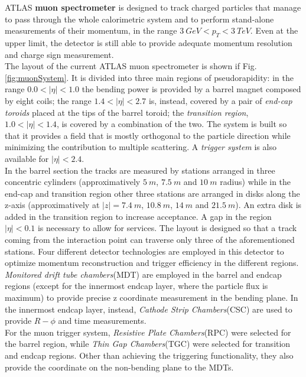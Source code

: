 \documentclass[a4paper,twoside,12pt]{article}
\begin{document}
ATLAS \textbf{muon spectrometer} is designed to track charged particles that manage to pass through the whole calorimetric system and to perform stand-alone measurements of their momentum, in the range 
$3\ GeV < p_{T} < 3\ TeV$. Even at the upper limit, the detector is still able to provide adequate momentum resolution and charge sign measurement.\\

The layout of the current  ATLAS muon spectrometer is shown if Fig. \ref{fig:muonSystem}. It is divided into three main regions of pseudorapidity: in the range $0.0 < |\eta| < 1.0$ the bending power
is provided by a barrel magnet composed by eight coils; the range $1.4 < |\eta| < 2.7$ is, instead, covered by a pair of \textit{end-cap toroids} placed at the tips of the barrel toroid; the \textit{transition
region}, $1.0 < |\eta| < 1.4$, is covered by a combination of the two. The system is built so that it provides a field that is mostly orthogonal to the particle direction while minimizing the contribution to multiple scattering. A \textit{trigger system} is also available for $|\eta| < 2.4$. \\

In the barrel section the tracks are measured by stations arranged in three concentric cylinders (approximatively $5\ m$, $7.5\ m$ and $10\ m$ radius) while in the end-cap and
transition region other three stations are arranged in disks along the z-axis (approximatively at  $|z| = 7.4\ m$, $10.8\ m$, $14\ m$ and $21.5\ m$). An extra disk is added in the transition
region to increase acceptance. A gap in the region $|\eta| < 0.1$ is necessary to allow for services. The layout is designed so that a track coming from the interaction point can traverse only three of the aforementioned stations.
Four different detector technologies are employed in this detector to optimize momentum reconstruction and trigger efficiency in the 
different regions.  \textit{Monitored drift tube chambers}(MDT) are employed in the barrel and endcap regions (except for the innermost endcap layer, where the particle flux is maximum) to provide precise z coordinate measurement in the bending plane. In the innermost endcap layer, instead, \textit{Cathode Strip Chambers}(CSC) are used to provide $R-\phi$ and time measurements. \\

For the muon trigger system, \textit{Resistive Plate Chambers}(RPC) were selected for the barrel region, while \textit{Thin Gap Chambers}(TGC) were selected for transition and endcap regions. Other
than achieving the triggering functionality, they also provide the coordinate on the non-bending plane to the MDTs. 
\end{document}
